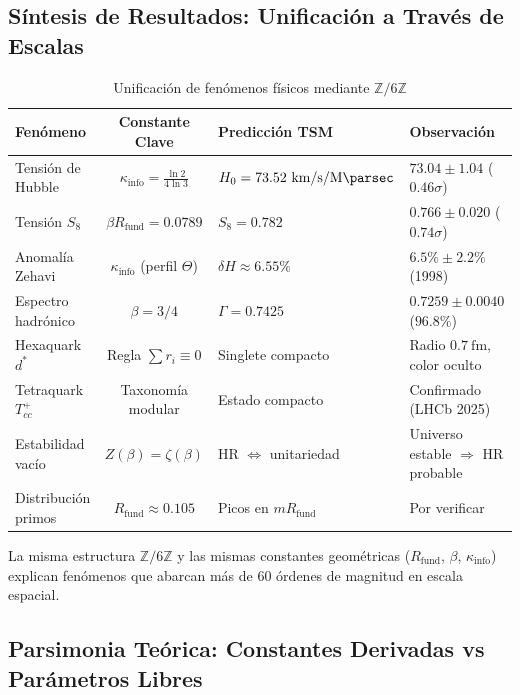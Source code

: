 \documentclass[11pt, a4paper]{article}
\theoremstyle{plain}
\theoremstyle{definition}
\newcommand{\Zmod}{\mathbb{Z}/6\mathbb{Z}}
\newcommand{\Rfactor}{R_{\text{fund}}}
\newcommand{\Kinfo}{\kappa_{\text{info}}}
\begin{document}
\subsection{Síntesis de Resultados: Unificación a Través de Escalas}

\begin{table}[H]
\centering
\caption{Unificación de fenómenos físicos mediante $\Zmod$}
\label{tab:unificacion_resultados}
\begin{tabular}{p{4cm}cp{3cm}p{3cm}}
\toprule
\textbf{Fenómeno} & \textbf{Constante Clave} & \textbf{Predicción TSM} & \textbf{Observación} \\
\midrule
Tensión de Hubble & $\Kinfo = \frac{\ln 2}{4\ln 3}$ & $H_0 = 73.52\ \si{\kilo\meter\per\second\per\mega\parsec}$ & $73.04 \pm 1.04$ ($0.46\sigma$) \\
Tensión $S_8$ & $\beta\Rfactor = 0.0789$ & $S_8 = 0.782$ & $0.766 \pm 0.020$ ($0.74\sigma$) \\
Anomalía Zehavi & $\Kinfo$ (perfil $\Theta$) & $\delta H \approx 6.55\%$ & $6.5\% \pm 2.2\%$ (1998) \\
\addlinespace
Espectro hadrónico & $\beta = 3/4$ & $\Gamma = 0.7425$ & $0.7259 \pm 0.0040$ ($96.8\%$) \\
Hexaquark $d^*$ & Regla $\sum r_i \equiv 0$ & Singlete compacto & Radio $0.7\ \si{\femto\meter}$, color oculto \\
Tetraquark $T_{cc}^+$ & Taxonomía modular & Estado compacto & Confirmado (LHCb 2025) \\
\addlinespace
Estabilidad vacío & $Z(\beta)=\zeta(\beta)$ & HR $\Leftrightarrow$ unitariedad & Universo estable $\Rightarrow$ HR probable \\
Distribución primos & $\Rfactor \approx 0.105$ & Picos en $m\Rfactor$ & Por verificar \\
\bottomrule
\end{tabular}
\end{table}

La misma estructura $\Zmod$ y las mismas constantes geométricas ($\Rfactor$, $\beta$, $\Kinfo$) explican fenómenos que abarcan más de 60 órdenes de magnitud en escala espacial.

\subsection{Parsimonia Teórica: Constantes Derivadas vs Parámetros Libres}
\end{document}
